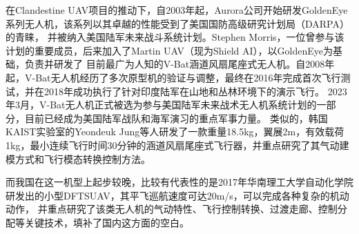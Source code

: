 在Clandestine UAV项目的推动下，自2003年起，Aurora公司开始研发GoldenEye系列无人机，该系列以其卓越的性能受到了美国国防高级研究计划局（DARPA）的青睐，
并被纳入美国陆军未来战斗系统计划。Stephen Morris，一位曾参与该计划的重要成员，后来加入了Martin UAV（现为Shield AI），以GoldenEye为基础，负责并研发了
目前最广为人知的V-Bat涵道风扇尾座式无人机。自2008年起，V-Bat无人机经历了多次原型机的验证与调整，最终在2016年完成首次飞行测试，并在2018年成功执行了针对印度陆军在山地和丛林环境下的演示飞行。
2023年3月，V-Bat无人机正式被选为参与美国陆军未来战术无人机系统计划的一部分，目前已经成为美国陆军战队和海军演习的重点军事力量。
类似的，韩国KAIST实验室的Yeondeuk Jung等人研发了一款重量18.5kg，翼展2m，有效载荷1kg，最小连续飞行时间30分钟的涵道风扇尾座式飞行器，并重点研究了其气动建模方式和飞行模态转换控制方法。

而我国在这一机型上起步较晚，比较有代表性的是2017年华南理工大学自动化学院研发出的小型DFTSUAV，其平飞巡航速度可达20m/s，可以完成各种复杂的机动动作，
并重点研究了该类无人机的气动特性、飞行控制转换、过渡走廊、控制分配等关键技术，填补了国内这方面的空白。

